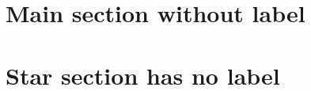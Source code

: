 \documentclass{article}
\begin{document}

\section{Main section without label}
\section*{Star section has no label}
\end{document}
